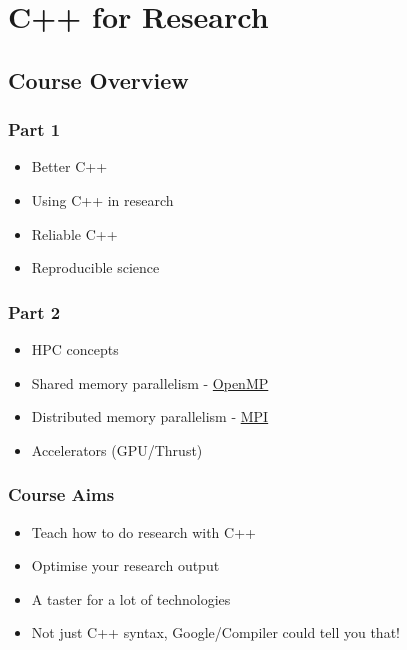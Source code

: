 \section{C++ for Research}\label{c-for-research}

\subsection{Course Overview}\label{course-overview}

\subsubsection{Part 1}\label{part-1}

\begin{itemize}
\itemsep1pt\parskip0pt
\item
  Better C++
\item
  Using C++ in research
\item
  Reliable C++
\item
  Reproducible science
\end{itemize}

\subsubsection{Part 2}\label{part-2}

\begin{itemize}
\itemsep1pt\parskip0pt
\item
  HPC concepts
\item
  Shared memory parallelism - \href{http://www.openmp.org}{OpenMP}
\item
  Distributed memory parallelism - \href{http://www.open-mpi.org}{MPI}
\item
  Accelerators (GPU/Thrust)
\end{itemize}

\subsubsection{Course Aims}\label{course-aims}

\begin{itemize}
\itemsep1pt\parskip0pt
\item
  Teach how to do research with C++
\item
  Optimise your research output
\item
  A taster for a lot of technologies
\item
  Not just C++ syntax, Google/Compiler could tell you that!
\end{itemize}

